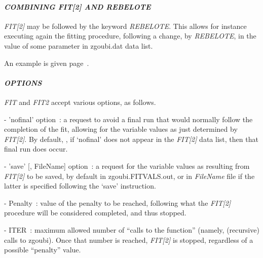 \bigskip

\paragraph{\textit{COMBINING FIT[2] AND REBELOTE } }    %


\noindent \textsl{FIT[2]} may be followed by the keyword  \textsl{REBELOTE}.  This allows for instance executing again 
the  fitting procedure, following a change, by  \textsl{REBELOTE}, in  the value of some parameter in zgoubi.dat data list. 


An example is given page~\pageref{ExaFITREBELOTE}. 



\bigskip

\paragraph{\textit{OPTIONS} }

\noindent \textsl{FIT} and \textsl{FIT2} accept various options, as follows. 

\smallskip

\noindent - 'nofinal' option~: \label{nofinal}
a request to avoid a final run that would normally follow the completion of the fit, allowing for the 
variable values as just determined by \textsl{FIT[2]}. By default, \ie, if `nofinal' does 
not appear in the   \textsl{FIT[2]} data list, then that final run does occur. 

\smallskip



\noindent - 'save' [, FileName] option~:  a request for the variable values as resulting from  \textsl{FIT[2]} to be saved, by 
default in zgoubi.FITVALS.out, or in \textsl{FileName} file if the latter is specified following the `save' instruction.

\smallskip

\noindent - Penalty~: value of the penalty to be reached, following what the  \textsl{FIT[2]} procedure 
will be considered completed, and thus  stopped. 

\smallskip

\noindent - ITER~: maximum allowed number of ``calls to the function'' (namely, (recursive) calls to zgoubi). Once that number is reached, 
 \textsl{FIT[2]} is stopped, regardless of a possible ``penalty'' value. 

